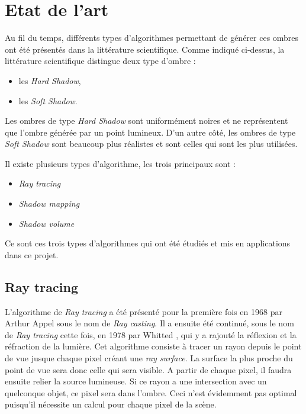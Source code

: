 \documentclass[a4paper,12pt]{report}
\begin{document}
\chapter{Etat de l'art}

Au fil du temps, différents types d'algorithmes permettant de générer ces ombres ont été présentés dans la littérature scientifique. Comme indiqué ci-dessus, la littérature scientifique distingue deux type d'ombre : 
\begin{itemize}
\item les \textit{Hard Shadow},
\item les \textit{Soft Shadow}.
\end{itemize}
Les ombres de type \textit{Hard Shadow} sont uniformément noires et ne représentent que l'ombre générée par un point lumineux. D'un autre côté, les ombres de type \textit{Soft Shadow} sont beaucoup plus réalistes et sont celles qui sont les plus utilisées.

Il existe plusieurs types d'algorithme, les trois principaux sont :
\begin{itemize}
\item{\textit{Ray tracing}}
\item{\textit{Shadow mapping}}
\item{\textit{Shadow volume}}
\end{itemize}

Ce sont ces trois types d'algorithmes qui ont été étudiés et mis en applications dans ce projet.

\section{Ray tracing}


L'algorithme de \textit{Ray tracing} a été présenté pour la première fois en 1968 par Arthur Appel\cite{appel1968some} sous le nom de \textit{Ray casting}. Il a ensuite été continué, sous le nom de \textit{Ray tracing} cette fois, en 1978 par Whitted \cite{whitted1978scan}, qui y a rajouté la réflexion et la réfraction de la lumière. 
Cet algorithme consiste à tracer un rayon depuis le point de vue jusque chaque pixel créant une \textit{ray surface}. La surface la plus proche du point de vue sera donc celle qui sera visible. A partir de chaque pixel, il faudra ensuite relier la source lumineuse. Si ce rayon a une intersection avec un quelconque objet, ce pixel sera dans l'ombre. Ceci n'est évidemment pas optimal puisqu'il nécessite un calcul pour chaque pixel de la scène.
\end{document}
